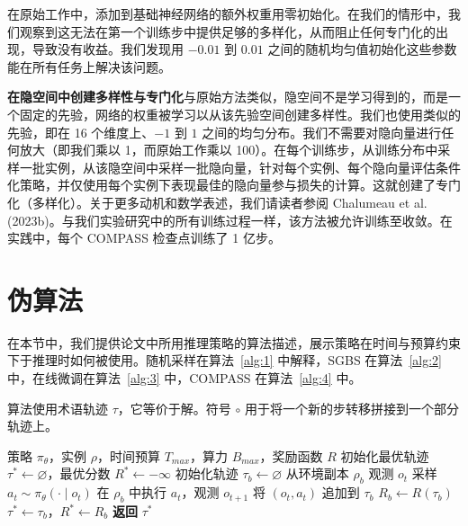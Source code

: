 \documentclass[11pt,UTF8,fontset=fandol]{ctexart}
\begin{document}
在原始工作中，添加到基础神经网络的额外权重用零初始化。在我们的情形中，我们观察到这无法在第一个训练步中提供足够的多样化，从而阻止任何专门化的出现，导致没有收益。我们发现用 $-0.01$ 到 $0.01$ 之间的随机均匀值初始化这些参数能在所有任务上解决该问题。

\textbf{在隐空间中创建多样性与专门化}\quad 与原始方法类似，隐空间不是学习得到的，而是一个固定的先验，网络的权重被学习以从该先验空间创建多样性。我们也使用类似的先验，即在 16 个维度上、$-1$ 到 $1$ 之间的均匀分布。我们不需要对隐向量进行任何放大（即我们乘以 1，而原始工作乘以 100）。在每个训练步，从训练分布中采样一批实例，从该隐空间中采样一批隐向量，针对每个实例、每个隐向量评估条件化策略，并仅使用每个实例下表现最佳的隐向量参与损失的计算。这就创建了专门化（多样化）。关于更多动机和数学表述，我们请读者参阅 Chalumeau et al. (2023b)。与我们实验研究中的所有训练过程一样，该方法被允许训练至收敛。在实践中，每个 COMPASS 检查点训练了 1 亿步。

\section{伪算法}

在本节中，我们提供论文中所用推理策略的算法描述，展示策略在时间与预算约束下于推理时如何被使用。随机采样在算法~\ref{alg:1} 中解释，SGBS 在算法~\ref{alg:2} 中，在线微调在算法~\ref{alg:3} 中，COMPASS 在算法~\ref{alg:4} 中。

算法使用术语轨迹 $\tau$，它等价于解。符号 $\circ$ 用于将一个新的步转移拼接到一个部分轨迹上。

\begin{algorithm}[H]
\caption{Stochastic Sampling（随机采样）}
\label{alg:1}
\begin{algorithmic}[1]
\Require 策略 $\pi_\theta$，实例 $\rho$，时间预算 $T_{max}$，算力 $B_{max}$，奖励函数 $R$
\State 初始化最优轨迹 $\tau^* \gets \varnothing$，最优分数 $R^* \gets -\infty$
    \State 初始化轨迹 $\tau_b \gets \varnothing$
      \State 从环境副本 $\rho_b$ 观测 $o_t$
      \State 采样 $a_t \sim \pi_\theta(\cdot \mid o_t)$
      \State 在 $\rho_b$ 中执行 $a_t$，观测 $o_{t+1}$
      \State 将 $(o_t, a_t)$ 追加到 $\tau_b$
    \EndFor
    \State $R_b \gets R(\tau_b)$
      \State $\tau^* \gets \tau_b$，$R^* \gets R_b$
    \EndIf
  \EndFor
\EndWhile
\State \textbf{返回} $\tau^*$
\end{algorithmic}
\end{algorithm}
\end{document}
